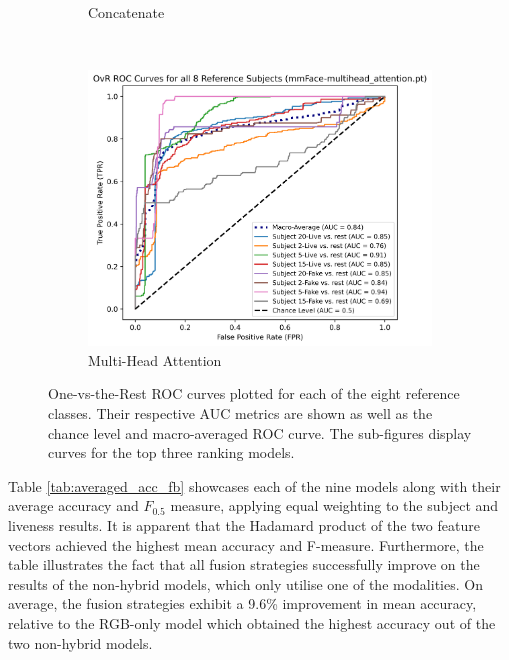 \documentclass{mpaper}
\begin{document}
\begin{figure}[ht!]
\begin{subfigure}[b]{0.315\textwidth}
        \caption{Concatenate}
        \label{fig:roc_concatenate}
    \end{subfigure}
    ~\hspace{0.001cm}
    \begin{subfigure}[b]{0.325\textwidth}
        \includegraphics[width=1.09\textwidth]{figures/roc_multihead_attention.png}
        \caption{Multi-Head Attention}
        \label{fig:roc_multihead_attention}
    \end{subfigure}
    \vspace{0.1cm}
    \caption{One-vs-the-Rest ROC curves plotted for each of the eight reference classes. Their respective AUC metrics are shown as well as the chance level and macro-averaged ROC curve. The sub-figures display curves for the top three ranking models.}
    \vspace{-0.35cm}
\end{figure}

Table \ref{tab:averaged_acc_fb} showcases each of the nine models along with their average accuracy and $F_{0.5}$ measure, applying equal weighting to the subject and liveness results. It is apparent that the Hadamard product of the two feature vectors achieved the highest mean accuracy and F-measure. Furthermore, the table illustrates the fact that all fusion strategies successfully improve on the results of the non-hybrid models, which only utilise one of the modalities. On average, the fusion strategies exhibit a 9.6\% improvement in mean accuracy, relative to the RGB-only model which obtained the highest accuracy out of the two non-hybrid models.
\end{document}

